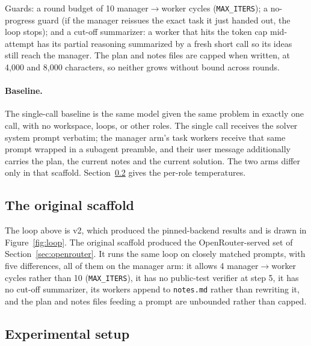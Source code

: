 \documentclass{article}
\begin{document}
Guards: a round budget of 10 manager$\to$worker cycles
(\texttt{MAX\_ITERS}); a no-progress guard (if the manager reissues the exact task it just
handed out, the loop stops); and a cut-off summarizer: a worker that hits the token cap
mid-attempt has its partial reasoning summarized by a fresh short call so its ideas still
reach the manager. The plan and notes files are capped when written, at 4,000 and 8,000
characters, so neither grows without bound across rounds.

\newpage
\paragraph{Baseline.} The single-call baseline is the same model given the same problem in exactly one call, with no
workspace, loops, or other roles. The single call receives the solver
system prompt verbatim; the manager arm's task workers receive that same prompt wrapped in a
subagent preamble, and their user message additionally
carries the plan, the current notes and the current solution. The two arms differ only in
that scaffold. Section~\ref{sec:setup} gives the per-role temperatures.

\subsection{The original scaffold}
\label{sec:scaffold-v1}

The loop above is v2, which produced the pinned-backend results and is drawn in
Figure~\ref{fig:loop}. The original scaffold produced the OpenRouter-served set of
Section~\ref{sec:openrouter}. It runs the same loop on closely matched prompts, with five
differences, all of them on the manager arm: it allows 4 manager$\to$worker cycles rather than 10
(\texttt{MAX\_ITERS}), it has no public-test verifier at step 5, it has no cut-off summarizer, its
workers append to \texttt{notes.md} rather than rewriting it, and the plan and notes files feeding
a prompt are unbounded rather than capped.

\subsection{Experimental setup}
\label{sec:setup}
\end{document}
